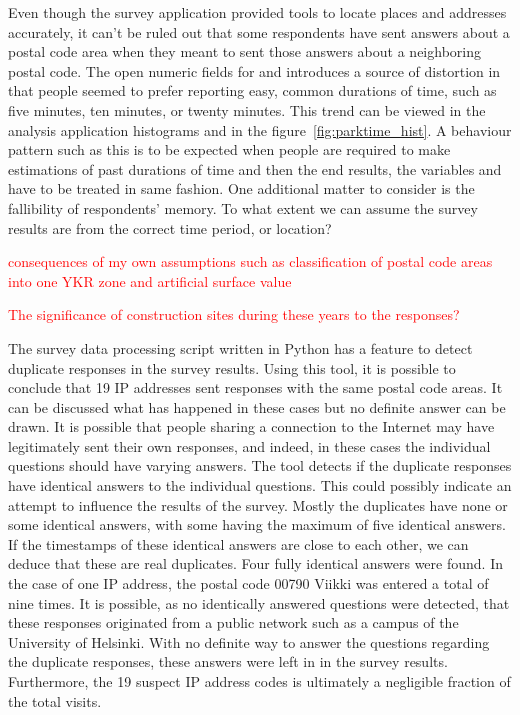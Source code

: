 Even though the survey application provided tools to locate places and addresses accurately, it can't be ruled out that some respondents have sent answers about a postal code area when they meant to sent those answers about a neighboring postal code. The open numeric fields for  and  introduces a source of distortion in that people seemed to prefer reporting easy, common durations of time, such as five minutes, ten minutes, or twenty minutes. This trend can be viewed in the analysis application histograms and in the figure~\ref{fig:parktime_hist}. A behaviour pattern such as this is to be expected when people are required to make estimations of past durations of time and then the end results, the variables  and  have to be treated in same fashion. One additional matter to consider is the fallibility of respondents' memory. To what extent we can assume the survey results are from the correct time period, or location?

\textcolor{red}{consequences of my own assumptions such as classification of postal code areas into one YKR zone and artificial surface value}

\textcolor{red}{The significance of construction sites during these years to the responses?}

The survey data processing script written in Python has a feature to detect duplicate responses in the survey results. Using this tool, it is possible to conclude that 19 IP addresses sent responses with the same postal code areas. It can be discussed what has happened in these cases but no definite answer can be drawn. It is possible that people sharing a connection to the Internet may have legitimately sent their own responses, and indeed, in these cases the individual questions should have varying answers. The tool detects if the duplicate responses have identical answers to the individual questions. This could possibly indicate an attempt to influence the results of the survey. Mostly the duplicates have none or some identical answers, with some having the maximum of five identical answers. If the timestamps of these identical answers are close to each other, we can deduce that these are real duplicates. Four fully identical answers were found. In the case of one IP address, the postal code 00790 Viikki was entered a total of nine times. It is possible, as no identically answered questions were detected, that these responses originated from a public network such as a campus of the University of Helsinki. With no definite way to answer the questions regarding the duplicate responses, these answers were left in in the survey results. Furthermore, the 19 suspect IP address codes is ultimately a negligible fraction of the total visits.

